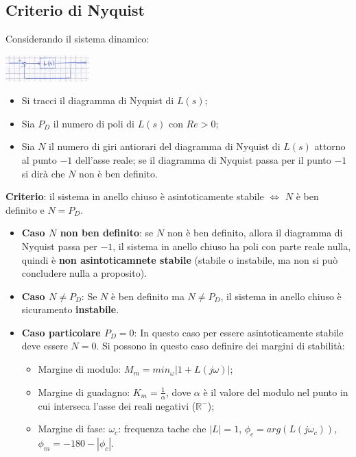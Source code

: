 \begin{landscape}
\begin{multicols*}{2}
    \subsection{Criterio di Nyquist}
    Considerando il sistema dinamico:
    \begin{center}
        \includegraphics[height=1cm]{../formulario/img1.JPG}
    \end{center}
    \begin{itemize}
        \item Si tracci il diagramma di Nyquist di $L(s)$;
        \item Sia $P_D$ il numero di poli di $L(s)$ con $Re > 0$;
        \item Sia $N$ il numero di giri antiorari del diagramma di Nyquist di $L(s)$ attorno al punto $-1$ dell'asse reale; se il diagramma di Nyquist passa per il punto $-1$ si dirà che $N$ non è ben definito.
    \end{itemize}
    \textbf{Criterio}: il sistema in anello chiuso è asintoticamente stabile $\Leftrightarrow$ $N$ è ben definito e $N = P_D$.
    \begin{itemize}
        \item \textbf{Caso $N$ non ben definito}:\newline
        se $N$ non è ben definito, allora il diagramma di Nyquist passa per $-1$, il sistema in anello chiuso ha poli con parte reale nulla, quindi è \textbf{non asintoticamnete stabile} (stabile o instabile, ma non si può concludere nulla a proposito).\newline
        \item \textbf{Caso $N \neq P_D$}:\newline
        Se $N$ è ben definito ma $N\neq P_D$, il sistema in anello chiuso è sicuramento \textbf{instabile}.\newline
        \item \textbf{Caso particolare $P_D = 0$}:\newline
        In questo caso per essere asintoticamente stabile deve essere $N = 0$. Si possono in questo caso definire dei margini di stabilità:
        \begin{itemize}
            \item Margine di modulo: $M_m = min_{\omega} | 1 + L(j \omega)|$;
            \item Margine di guadagno: $K_m = \frac{1}{\alpha}$, dove $\alpha$ è il valore del modulo nel punto in cui interseca l'asse dei reali negativi ($\mathbb{R}^{-}$);
            \item Margine di fase: $\omega_c$: frequenza tache che $|L| = 1$, $\phi_c = arg(L(j \omega_c))$, $\phi_m = -180 - |\phi_c|$.
        \end{itemize}
    \end{itemize}

\end{multicols*}
\end{landscape}
